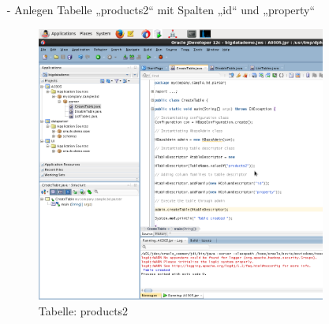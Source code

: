 \begin{itemize}
\item[-] Anlegen Tabelle „products2“ mit Spalten „id“ und „property“
\begin{figure}[!htb]
        \begin{minipage}{1\textwidth}
                \centering
                \includegraphics[width=0.90\textwidth]{pics/hbase2.png}\par\vspace{0cm}
                \caption{Tabelle: products2}
                \label{fig:hbase2}
        \end{minipage}
\end{figure}


\end{itemize}
